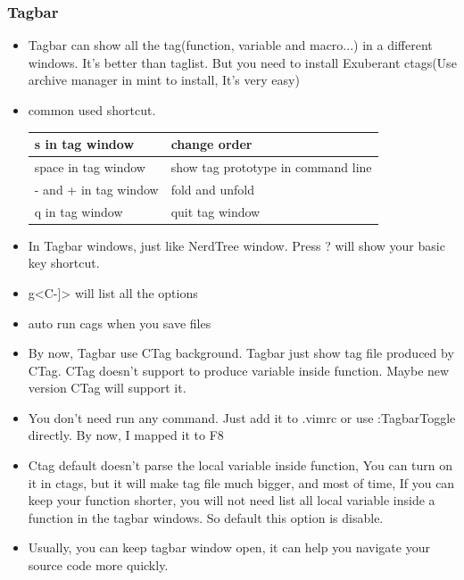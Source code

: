 \documentclass[a4paper,12pt,twoside]{book}
\begin{document}
\subsubsection{Tagbar}
\begin{itemize}
\item Tagbar can show all the tag(function, variable and macro...) in a different windows. It's better than taglist. But you need to install Exuberant ctags(Use archive manager in mint to install, It's very easy)

\item common used shortcut.	\\	
\begin{tabular}{|p{}|p{}|}
\hline 
s in tag window & change order \\ 

\hline 
space in tag window & show tag prototype in command line  \\ 

\hline 
- and + in tag window & fold and unfold \\ 

\hline 
q in tag window & quit tag window \\ 

\hline 
\end{tabular}
\item In Tagbar windows, just like NerdTree window. Press ? will show your basic key shortcut. 
		
\item g<C-]> will list all the options
		
\item auto run cags when you save files

\item By now, Tagbar use CTag background. Tagbar just show tag file produced by CTag. CTag doesn't support to produce variable inside function. Maybe new version CTag will support it. 

\item You don't need run any command. Just add it to .vimrc or use :TagbarToggle directly. By now, I mapped it to F8

\item Ctag default doesn't parse the local variable inside function, You can turn on it in ctags, but it will make tag file much bigger, and most of time, If you can keep your function shorter, you will not need list all local variable inside a function in the tagbar windows. So default this option is disable. 

\item Usually, you can keep tagbar window open, it can help you navigate your source code more quickly. 
\end{itemize}
\end{document}
